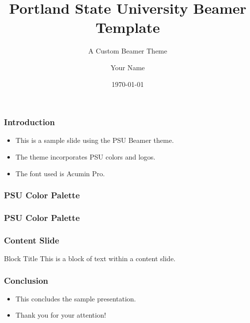 \documentclass{beamer}
\title{Portland State University Beamer Template}
\subtitle{A Custom Beamer Theme}
\author{Your Name}
\institute{Portland State University}
\date{\today}
\begin{document}
	\begin{frame}
		\titlepage
	\end{frame}

	\begin{frame}
		\frametitle{Introduction}
		\begin{itemize}
			\item This is a sample slide using the PSU Beamer theme.

			\item The theme incorporates PSU colors and logos.

			\item The font used is Acumin Pro.
		\end{itemize}
	\end{frame}

	\begin{frame}
		\frametitle{PSU Color Palette}
		\showPSUColorsPrimary
	\end{frame}

	\begin{frame}
		\frametitle{PSU Color Palette}
		\showPSUColorsSecondary
	\end{frame}

	\begin{frame}
		\frametitle{Content Slide}
		\begin{block}{Block Title}
			This is a block of text within a content slide.
		\end{block}
	\end{frame}


	\begin{frame}
		\frametitle{Conclusion}
		\begin{itemize}
			\item This concludes the sample presentation.

			\item Thank you for your attention!
		\end{itemize}
	\end{frame}
\end{document}
